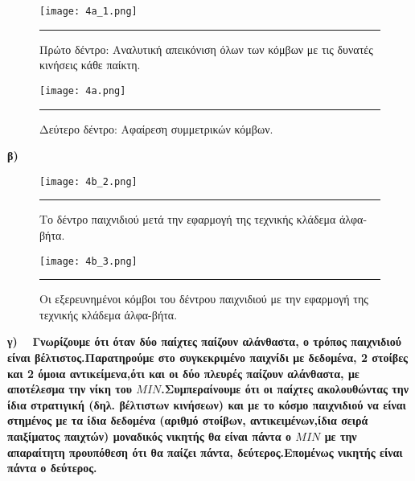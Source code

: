 \documentclass[10pt]{article}
\begin{document}
\begin{figure}[H]
    \centering
    \texttt{[image: 4a\_1.png]} \\
    \caption{Πρώτο δέντρο: Αναλυτική απεικόνιση όλων των κόμβων με τις δυνατές κινήσεις κάθε παίκτη.}

    \begin{center}
        \rule{120mm}{0.2mm}
    \end{center}
    \vspace{10mm}
\end{figure}
\begin{figure}[H]
    \centering
    \texttt{[image: 4a.png]} \\
    \caption{Δεύτερο δέντρο: Αφαίρεση συμμετρικών κόμβων. }

    \begin{center}
        \rule{120mm}{0.2mm}
    \end{center}
\end{figure}
\bf β) \ \normalfont
\begin{figure} [H] 
    \vspace{10mm}
    \centering
    \texttt{[image: 4b\_2.png]} \\
    \caption{Το δέντρο παιχνιδιού μετά την εφαρμογή της τεχνικής κλάδεμα άλφα-βήτα. }

    \begin{center}
        \rule{120mm}{0.2mm}
    \end{center}
\end{figure}
\begin{figure}[H]
    \centering
    \texttt{[image: 4b\_3.png]} \\
    \caption{Οι εξερευνημένοι κόμβοι του δέντρου παιχνιδιού με την εφαρμογή της τεχνικής κλάδεμα άλφα-βήτα. }

    \begin{center}
        \rule{120mm}{0.2mm}
    \end{center}
    
\end{figure} 

\bf γ) \ \normalfont 
Γνωρίζουμε ότι όταν δύο παίχτες παίζουν αλάνθαστα, ο τρόπος παιχνιδιού είναι βέλτιστος.Παρατηρούμε στο συγκεκριμένο παιχνίδι με δεδομένα, 2 στοίβες και 2 όμοια αντικείμενα,ότι και οι δύο πλευρές παίζουν αλάνθαστα, με αποτέλεσμα την νίκη του $MIN$.Συμπεραίνουμε ότι οι παίχτες ακολουθώντας την ίδια στρατιγική (δηλ. βέλτιστων κινήσεων) και με το κόσμο παιχνιδιού να είναι στημένος με τα ίδια δεδομένα (αριθμό στοίβων, αντικειμένων,ίδια σειρά παιξίματος παιχτών) μοναδικός νικητής θα είναι πάντα ο $MIN$ με την απαραίτητη προυπόθεση ότι θα παίζει πάντα, δεύτερος.Επομένως νικητής είναι πάντα ο δεύτερος.
\end{document}
